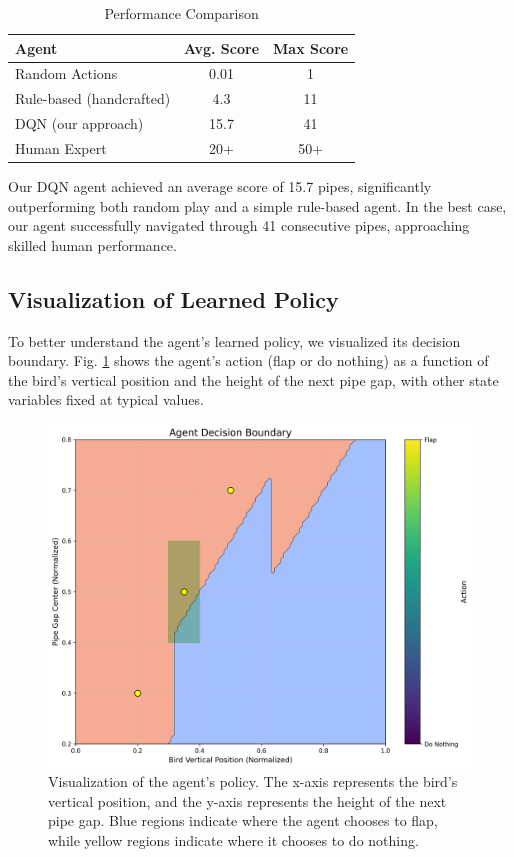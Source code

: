 \documentclass[conference]{IEEEtran}
\begin{document}
\begin{table}[!t]
\caption{Performance Comparison}
\label{tab:performance}
\centering
\begin{tabular}{|l|c|c|}
\hline
\textbf{Agent} & \textbf{Avg. Score} & \textbf{Max Score} \\
\hline
Random Actions & 0.01 & 1 \\
\hline
Rule-based (handcrafted) & 4.3 & 11 \\
\hline
DQN (our approach) & 15.7 & 41 \\
\hline
Human Expert & 20+ & 50+ \\
\hline
\end{tabular}
\end{table}

Our DQN agent achieved an average score of 15.7 pipes, significantly outperforming both random play and a simple rule-based agent. In the best case, our agent successfully navigated through 41 consecutive pipes, approaching skilled human performance.

\subsection{Visualization of Learned Policy}
To better understand the agent's learned policy, we visualized its decision boundary. Fig. \ref{fig:decision_boundary} shows the agent's action (flap or do nothing) as a function of the bird's vertical position and the height of the next pipe gap, with other state variables fixed at typical values.

\begin{figure}[!t]
\centering
\includegraphics[width=\columnwidth]{figures/decision_boundary.png}
\caption{Visualization of the agent's policy. The x-axis represents the bird's vertical position, and the y-axis represents the height of the next pipe gap. Blue regions indicate where the agent chooses to flap, while yellow regions indicate where it chooses to do nothing.}
\label{fig:decision_boundary}
\end{figure}
\end{document}
